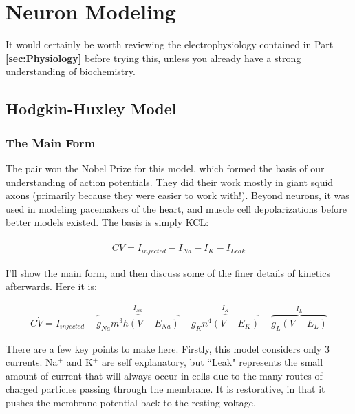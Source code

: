 \chapter{Neuron Modeling}

It would certainly be worth reviewing the electrophysiology contained in Part \textbf{\ref{sec:Physiology}} before trying this, unless you already have a strong understanding of biochemistry.  


\section{Hodgkin-Huxley Model} 

\subsection{The Main Form} The pair won the Nobel Prize for this model, which formed the basis of our understanding of action potentials. They did their work mostly in giant squid axons (primarily because they were easier to work with!). Beyond neurons, it was used in modeling pacemakers of the heart, and muscle cell depolarizations before better models existed.  The basis is simply KCL: 

\bigskip

\begin{equation} \label{hh1}
\begin{split}
C\dot{V} = I_{injected} - I_{Na} - I_{K} - I_{Leak}
\end{split}
\end{equation}

\bigskip

I'll show the main form, and then discuss some of the finer details of kinetics afterwards. Here it is: 

\bigskip

\begin{equation} \label{hh2}
\begin{split}
C\dot{V} = I_{injected} - \overbrace{\bar{g}_{Na}m^3h(V - E_{Na})}^{I_{Na}} - \overbrace{\bar{g}_{K}n^4(V - E_{K})}^{I_{K}} - \overbrace{\bar{g}_{L}(V - E_{L})}^{I_{L}}
\end{split}
\end{equation}

\bigskip 

There are a few key points to make here. Firstly, this model considers only 3 currents. Na$^+$ and K$^+$ are self explanatory, but ``Leak" represents the small amount of current that will always occur in cells due to the many routes of charged particles passing through the membrane. It is restorative, in that it pushes the membrane potential back to the resting voltage.

